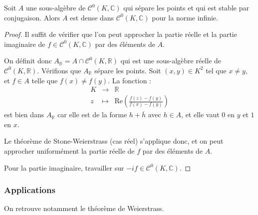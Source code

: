 \documentclass[french]{article}
\newcommand{\R}{\mathbb{R}}
\newcommand{\C}{\mathbb{C}}
\theoremstyle{plain}
\theoremstyle{definition}
\theoremstyle{remark}
\begin{document}
\begin{thm}%
	Soit $A$ une sous-algèbre de $\mathcal{C}^0(K,\C)$ qui sépare les points et qui est stable par conjugaison. Alors $A$ est dense dans $\mathcal{C}^0(K,\C)$ pour la norme infinie.
\end{thm}
\begin{proof}
	Il suffit de vérifier  que l'on peut approcher la partie réelle et la partie imaginaire de $f\in\mathcal{C}^0(K,\C)$ par des éléments de $A$.
	
	On définit donc $A_\R=A\cap\mathcal{C}^0(K,\R)$ qui est une sous-algèbre réelle de $\mathcal{C}^0(K,\R)$. Vérifions que $A_\R$ sépare les points. Soit $(x,y)\in K^2$ tel que $x\ne y$, et $f\in A$ telle que $f(x)\ne f(y)$. La fonction :
	$$\begin{array}{rcl}
		K&\longrightarrow&\R\\
		z&\longmapsto&\displaystyle\text{Re}\left(\frac{f(z)-f(y)}{f(x)-f(y)}\right)
	\end{array}$$ est bien dans $A_\R$ car elle est de la forme $h+\overline{h}$ avec $h\in A$, et elle vaut $0$ en $y$ et $1$ en $x$. 
	
	Le théorème de Stone-Weierstrass (cas réel) s'applique donc, et on peut approcher uniformément la partie réelle de $f$ par des éléments de $A$. 
	
	Pour la partie imaginaire, travailler sur $-if\in\mathcal{C}^0(K,\C)$.
\end{proof}

\subsubsection*{Applications}

On retrouve notamment le théorème de Weierstrass.

\begin{thm}%
	
\end{thm}
\end{document}
